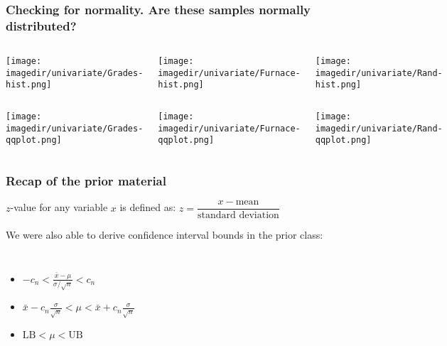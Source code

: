 \begin{frame}\frametitle{Checking for normality. Are these samples normally distributed?}

	\begin{columns}[t]
			\centerline{	\texttt{[image: \\imagedir/univariate/Grades-hist.png]}	}
			\centerline{	\texttt{[image: \\imagedir/univariate/Furnace-hist.png]}	}
			\centerline{	\texttt{[image: \\imagedir/univariate/Rand-hist.png]}	}
	\end{columns}
	
	\vspace{10pt}
	\begin{columns}[t]
			\centerline{	\texttt{[image: \\imagedir/univariate/Grades-qqplot.png]}	}
			\centerline{	\texttt{[image: \\imagedir/univariate/Furnace-qqplot.png]}	}
			\centerline{	\texttt{[image: \\imagedir/univariate/Rand-qqplot.png]}	}
	\end{columns}
\end{frame}


\begin{frame}\frametitle{Recap of the prior material}
	$z$-value for any variable $x$ is defined as: $z = \dfrac{x - \text{mean}}{\text{standard deviation}}$
	
	\vspace{18pt}
	We were also able to derive confidence interval bounds in the prior class:
	
	\begin{columns}[t]
			\begin{itemize}
				\item	$\displaystyle - c_n < \frac{\bar{x} - \mu}{\sigma / \sqrt{n}} < c_n$
		
				\vspace{10pt}
				\item	$\displaystyle \bar{x} - c_n\frac{\sigma}{\sqrt{n}} < \mu < \bar{x} + c_n\frac{\sigma}{\sqrt{n}}$
		
				\vspace{10pt}
				\item	$\displaystyle \text{LB} < \mu < \text{UB}$
			\end{itemize}
	\end{columns}
	
\end{frame}

